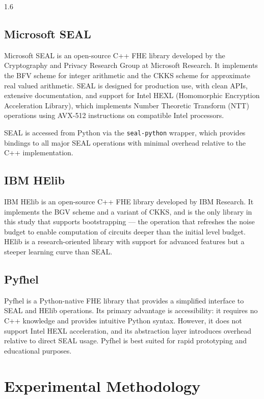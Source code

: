 \begin{spacing}{1.6}
\subsection{Microsoft SEAL}

Microsoft SEAL \cite{seal} is an open-source C++ FHE library developed by the
Cryptography and Privacy Research Group at Microsoft Research. It implements
the BFV scheme for integer arithmetic and the CKKS scheme for approximate
real valued arithmetic. SEAL is designed for production use, with clean APIs,
extensive documentation, and support for Intel HEXL (Homomorphic Encryption
Acceleration Library), which implements Number Theoretic Transform (NTT)
operations using AVX-512 instructions on compatible Intel processors.

SEAL is accessed from Python via the \texttt{seal-python} wrapper, which
provides bindings to all major SEAL operations with minimal overhead relative
to the C++ implementation.

\subsection{IBM HElib}

IBM HElib \cite{helib} is an open-source C++ FHE library developed by IBM
Research. It implements the BGV scheme and a variant of CKKS, and is the only
library in this study that supports bootstrapping --- the operation that
refreshes the noise budget to enable computation of circuits deeper than the
initial level budget. HElib is a research-oriented library with support for
advanced features but a steeper learning curve than SEAL.

\subsection{Pyfhel}

Pyfhel \cite{pyfhel} is a Python-native FHE library that provides a simplified
interface to SEAL and HElib operations. Its primary advantage is accessibility:
it requires no C++ knowledge and provides intuitive Python syntax. However, it
does not support Intel HEXL acceleration, and its abstraction layer introduces
overhead relative to direct SEAL usage. Pyfhel is best suited for rapid
prototyping and educational purposes.

\section{Experimental Methodology}


\end{spacing}
